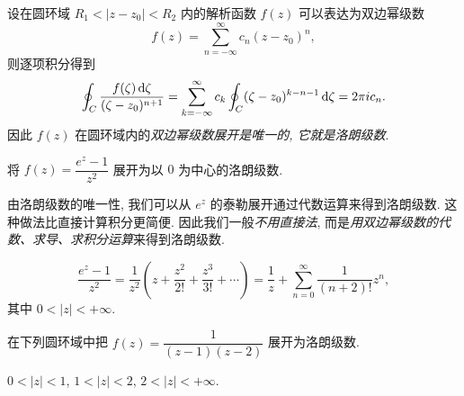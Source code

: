 设在圆环域 $R_1<|z-z_0|<R_2$ 内的解析函数 $f(z)$ 可以表达为双边幂级数
\[f(z)=\sum_{n=-\infty}^\infty c_n(z-z_0)^n,\]
则逐项积分得到
\[\oint_C\frac{f(\zeta)\,\mathrm{d}\zeta}{(\zeta-z_0)^{n+1}}=\sum_{k=-\infty}^\infty c_k\oint_C(\zeta-z_0)^{k-n-1}\,\mathrm{d}\zeta=2\pi i c_n.\]
因此 $f(z)$ 在圆环域内的\emph{双边幂级数展开是唯一的, 它就是洛朗级数}.

\begin{example}
	将 $f(z)=\dfrac{e^z-1}{z^2}$ 展开为以 $0$ 为中心的洛朗级数.
\end{example}

由洛朗级数的唯一性, 我们可以从 $e^z$ 的泰勒展开通过代数运算来得到洛朗级数.
这种做法比直接计算积分更简便.
因此我们一般\emph{不用直接法}, 而是\emph{用双边幂级数的代数、求导、求积分运算}来得到洛朗级数.

\begin{solution}
	\[\frac{e^z-1}{z^2}=\frac1{z^2}\left(z+\frac{z^2}{2!}+\frac{z^3}{3!}+\cdots\right)
	{=\frac1z+\sum_{n=0}^\infty \frac1{(n+2)!}z^n,}\]
	{其中 $0<|z|<+\infty$.}
\end{solution}

\begin{example}
	在下列圆环域中把 $f(z)=\dfrac1{(z-1)(z-2)}$ 展开为洛朗级数.

	{ $0<|z|<1$,  $1<|z|<2$,  $2<|z|<+\infty$.}
\end{example}

